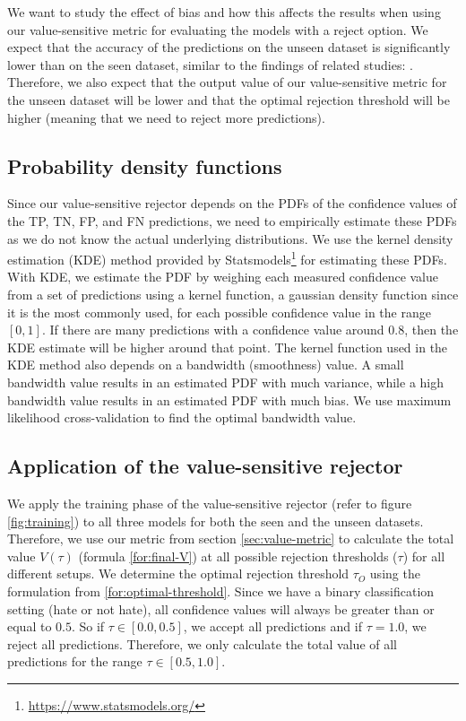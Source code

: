 %
We want to study the effect of bias and how this affects the results when using our value-sensitive metric for evaluating the models with a reject option.
%
We expect that the accuracy of the predictions on the unseen dataset is significantly lower than on the seen dataset, similar to the findings of related studies: \citet{grondahl2018all, arango2019hate}.
%
Therefore, we also expect that the output value of our value-sensitive metric for the unseen dataset will be lower and that the optimal rejection threshold will be higher (meaning that we need to reject more predictions).
%

\subsection{Probability density functions}
Since our value-sensitive rejector depends on the PDFs of the confidence values of the TP, TN, FP, and FN predictions, we need to empirically estimate these PDFs as we do not know the actual underlying distributions.
%
We use the kernel density estimation (KDE) method provided by Statsmodels\footnote{\url{https://www.statsmodels.org/}} for estimating these PDFs.
%
With KDE, we estimate the PDF by weighing each measured confidence value from a set of predictions using a kernel function, a gaussian density function since it is the most commonly used, for each possible confidence value in the range $[0, 1]$.
%
If there are many predictions with a confidence value around $0.8$, then the KDE estimate will be higher around that point.
%
The kernel function used in the KDE method also depends on a bandwidth (smoothness) value.
%
A small bandwidth value results in an estimated PDF with much variance, while a high bandwidth value results in an estimated PDF with much bias.
%
We use maximum likelihood cross-validation to find the optimal bandwidth value.

\subsection{Application of the value-sensitive rejector}
\label{sec:rejector-application}
We apply the training phase of the value-sensitive rejector (refer to figure \ref{fig:training}) to all three models for both the seen and the unseen datasets.
%
Therefore, we use our metric from section \ref{sec:value-metric} to calculate the total value $V(\tau)$ (formula \ref{for:final-V}) at all possible rejection thresholds ($\tau$) for all different setups.
%
We determine the optimal rejection threshold $\tau_O$ using the formulation from \ref{for:optimal-threshold}.
%
Since we have a binary classification setting (hate or not hate), all confidence values will always be greater than or equal to $0.5$.
%
So if $\tau \in [0.0, 0.5]$, we accept all predictions and if $\tau = 1.0$, we reject all predictions.
%
Therefore, we only calculate the total value of all predictions for the range $\tau \in [0.5, 1.0]$.
%

